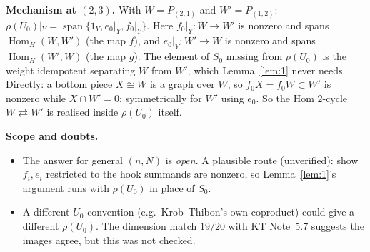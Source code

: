 \documentclass[11pt]{amsart}
\newcommand{\Hom}{\operatorname{Hom}}
\theoremstyle{plain}
\theoremstyle{definition}
\begin{document}
\smallskip
\noindent\textbf{Mechanism at $(2,3)$.} With $W=P_{(2,1)}$ and $W'=P_{(1,2)}$: $\rho(U_0)|_Y=\operatorname{span}\{1_Y,e_0|_Y,f_0|_Y\}$. Here $f_0|_Y:W\to W'$ is nonzero and spans $\Hom_H(W,W')$ (the map $f$), and $e_0|_Y:W'\to W$ is nonzero and spans $\Hom_H(W',W)$ (the map $g$). The element of $S_0$ missing from $\rho(U_0)$ is the weight idempotent separating $W$ from $W'$, which Lemma~\ref{lem:1} never needs. Directly: a bottom piece $X\cong W$ is a graph over $W$, so $f_0X=f_0W\subset W'$ is nonzero while $X\cap W'=0$; symmetrically for $W'$ using $e_0$. So the Hom $2$-cycle $W\rightleftarrows W'$ is realised inside $\rho(U_0)$ itself.

\smallskip
\noindent\textbf{Scope and doubts.}
\begin{itemize}[leftmargin=*,itemsep=1pt]
\item The answer for general $(n,N)$ is \emph{open}. A plausible route (unverified): show $f_i,e_i$ restricted to the hook summands are nonzero, so Lemma~\ref{lem:1}'s argument runs with $\rho(U_0)$ in place of $S_0$.
\item A different $U_0$ convention (e.g.\ Krob--Thibon's own coproduct) could give a different $\rho(U_0)$. The dimension match $19/20$ with KT Note~5.7 suggests the images agree, but this was not checked.
\end{itemize}
\end{document}
